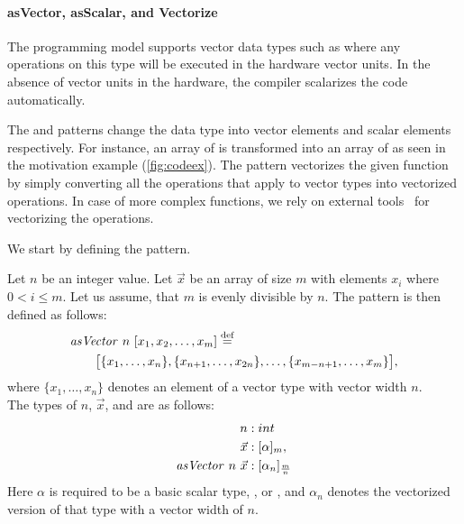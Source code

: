 

\paragraph{{\footnotesize as}Vector, {\footnotesize as}Scalar, and Vectorize}
The \OpenCL programming model supports vector data types such as  where any operations on this type will be executed in the hardware vector units.
In the absence of vector units in the hardware, the \OpenCL compiler scalarizes the code automatically.

The \asVector and \asScalar patterns change the data type into vector elements and scalar elements respectively.
For instance, an array of  is transformed into an array of  as seen in the motivation example (\autoref{fig:codeex}).
The \vect pattern vectorizes the given function by simply converting all the operations that apply to vector types into vectorized operations. 
In case of more complex functions, we rely on external tools~\cite{KarrenbergHa2011} for vectorizing the operations.

We start by defining the \asVector pattern.
\begin{definition}
  \label{definition:pattern:asVector}
  Let $n$ be an integer value.
  Let $\vec{x}$ be an array of size $m$ with elements $x_i$ where $0 < i \leq m$.
  Let us assume, that $m$ is evenly divisible by $n$.
  The \asVector pattern is then defined as follows:
  \begin{align*}
    &\text{\textit{asVector}}\ n\ [x_1, x_2, \dots, x_m] \stackrel{\textrm{\scriptsize def}}{=} \\
    &\qquad\big[\{x_1, \ldots, x_n\}, \{x_{n+1}, \ldots, x_{2n}\}, \ldots, \{x_{m-n+1}, \ldots, x_m\}\big],
  \end{align*}
  where $\{x_1,\ldots,x_n\}$ denotes an element of a vector type with vector width $n$.\\
  The types of $n$, $\vec{x}$, and \asVector are as follows:
  \begin{align*}
    n &: int\\
    \vec{x} &: [\alpha]_m,\\
    \text{\textit{asVector}}\ n\ \vec{x} &: [\alpha_n]_{\frac{m}{n}}
  \end{align*}
  Here $\alpha$ is required to be a basic scalar type, \eg,  or , and $\alpha_n$ denotes the vectorized version of that type with a vector width of $n$.
\end{definition}


